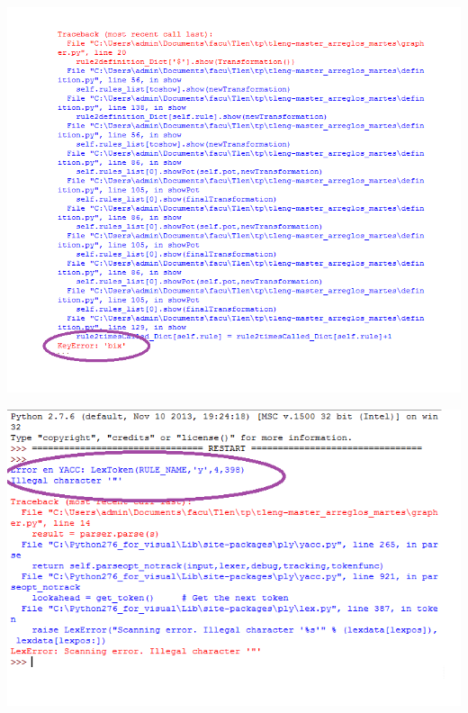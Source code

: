 

\centerline{\includegraphics[scale=0.70]{../imagenes/eg22invalid2.png}}



\centerline{\includegraphics[scale=0.70]{../imagenes/carainvalid.png}}